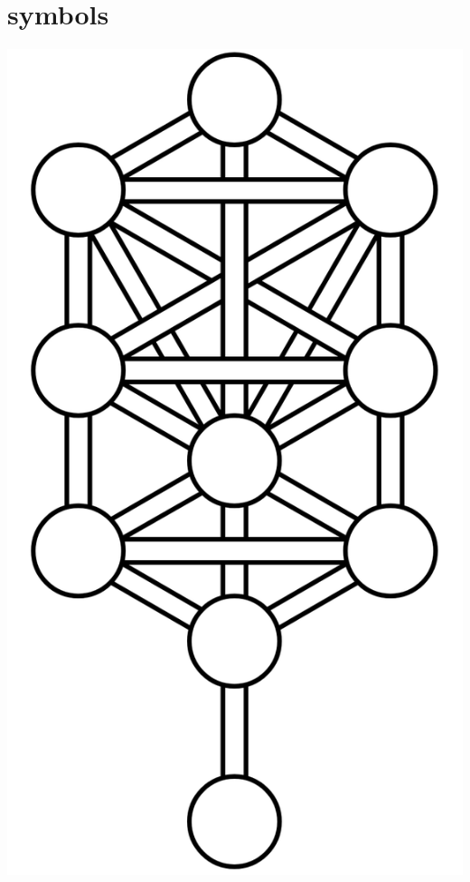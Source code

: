 \hypertarget{symbols}{%
\section{symbols}\label{symbols}}

\includegraphics{imageserver/uploadimages/image1.png}

